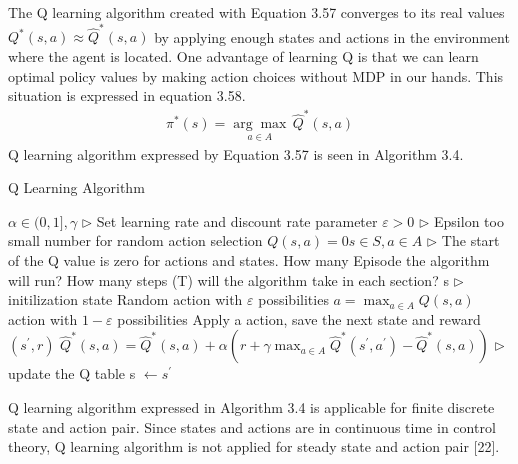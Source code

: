 \documentclass[12pt,twoside,a4]{mwbk}
\begin{document}
The Q learning algorithm created with Equation 3.57 converges to its real values $Q^{*}(s, a) \approx \widehat{Q}^{*}(s, a)$ by applying enough states and actions in the environment where the agent is located. One advantage of learning Q is that we can learn optimal policy values by making action choices without MDP in our hands. This situation is expressed in equation 3.58.
\begin{subequations}
\begin{align}
    \pi^{\ast } (s) = \underset{a \in A}{\arg \max } \,\hat{Q}^{\ast } (s,a)
\end{align}
\end{subequations}
Q learning algorithm expressed by Equation 3.57 is seen in Algorithm 3.4.
\begin{algorithm}
\caption{Q Learning Algorithm}
\begin{algorithmic}[1]
\State $\alpha \in (0,1], \gamma$ $\triangleright$ Set learning rate and discount rate parameter
\State $\varepsilon > 0$ $\triangleright$ Epsilon too small number for random action selection
\State $Q(s,a) = 0s \in S, a \in A$ $\triangleright$ The start of the Q value is zero for actions and states.
\State How many Episode the algorithm will run?
\State How many steps (T) will the algorithm take in each section?
    \State s $\triangleright$ initilization state
        \State Random action with $\varepsilon$ possibilities
        \State  $a = \max_{a \in A} Q(s,a)$ action with $1 - \varepsilon$ possibilities
        \State Apply a action, save the next state and reward $(s^{\prime}, r)$ 
        \State $\hat{Q}^{*}(s, a)=\widehat{Q}^{*}(s, a)+\alpha(r+\gamma \max _{a \in A} \widehat{Q}^{*}\left(s^{\prime}, a^{\prime}\right)-\widehat{Q}^{*}(s, a))$ $\triangleright$ update the Q table
        \State s $\leftarrow s^{\prime}$
        \EndFor
        \EndFor
\end{algorithmic}
\end{algorithm}

\noindent Q learning algorithm expressed in Algorithm 3.4 is applicable for finite discrete state and action pair. Since states and actions are in continuous time in control theory, Q learning algorithm is not applied for steady state and action pair [22].
\end{document}
